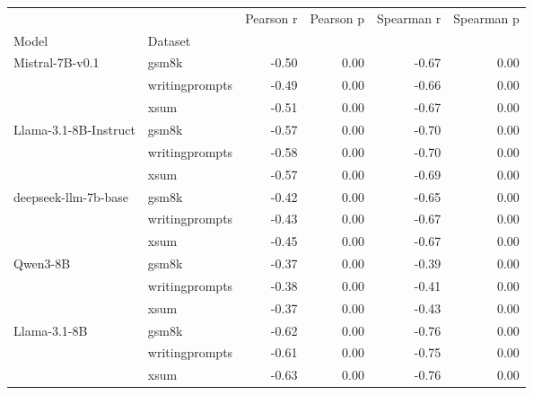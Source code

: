 \begin{tabular}{llrrrr}
\toprule
 &  & Pearson r & Pearson p & Spearman r & Spearman p \\
Model & Dataset &  &  &  &  \\
\midrule
\multirow[t]{3}{*}{Mistral-7B-v0.1} & gsm8k & -0.50 & 0.00 & -0.67 & 0.00 \\
 & writingprompts & -0.49 & 0.00 & -0.66 & 0.00 \\
 & xsum & -0.51 & 0.00 & -0.67 & 0.00 \\
\cline{1-6}
\multirow[t]{3}{*}{Llama-3.1-8B-Instruct} & gsm8k & -0.57 & 0.00 & -0.70 & 0.00 \\
 & writingprompts & -0.58 & 0.00 & -0.70 & 0.00 \\
 & xsum & -0.57 & 0.00 & -0.69 & 0.00 \\
\cline{1-6}
\multirow[t]{3}{*}{deepseek-llm-7b-base} & gsm8k & -0.42 & 0.00 & -0.65 & 0.00 \\
 & writingprompts & -0.43 & 0.00 & -0.67 & 0.00 \\
 & xsum & -0.45 & 0.00 & -0.67 & 0.00 \\
\cline{1-6}
\multirow[t]{3}{*}{Qwen3-8B} & gsm8k & -0.37 & 0.00 & -0.39 & 0.00 \\
 & writingprompts & -0.38 & 0.00 & -0.41 & 0.00 \\
 & xsum & -0.37 & 0.00 & -0.43 & 0.00 \\
\cline{1-6}
\multirow[t]{3}{*}{Llama-3.1-8B} & gsm8k & -0.62 & 0.00 & -0.76 & 0.00 \\
 & writingprompts & -0.61 & 0.00 & -0.75 & 0.00 \\
 & xsum & -0.63 & 0.00 & -0.76 & 0.00 \\
\cline{1-6}
\bottomrule
\end{tabular}

